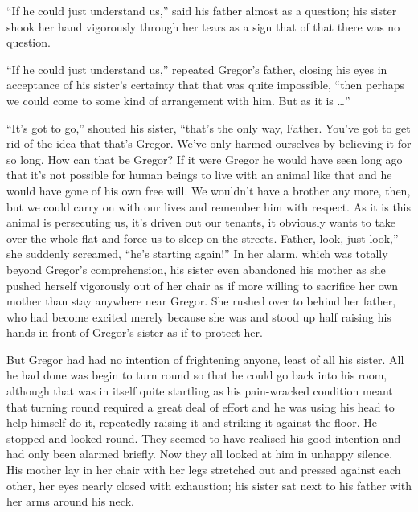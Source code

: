 \documentclass[12pt]{report}
\begin{document}
``If he could just understand us,'' said his father almost as a
question; his sister shook her hand vigorously through her tears as a
sign that of that there was no question.

``If he could just understand us,'' repeated Gregor's father, closing
his eyes in acceptance of his sister's certainty that that was quite
impossible, ``then perhaps we could come to some kind of arrangement
with him. But as it is \ldots{}''

``It's got to go,'' shouted his sister, ``that's the only way, Father.
You've got to get rid of the idea that that's Gregor. We've only harmed
ourselves by believing it for so long. How can that be Gregor? If it
were Gregor he would have seen long ago that it's not possible for human
beings to live with an animal like that and he would have gone of his
own free will. We wouldn't have a brother any more, then, but we could
carry on with our lives and remember him with respect. As it is this
animal is persecuting us, it's driven out our tenants, it obviously
wants to take over the whole flat and force us to sleep on the streets.
Father, look, just look,'' she suddenly screamed, ``he's starting
again!'' In her alarm, which was totally beyond Gregor's comprehension,
his sister even abandoned his mother as she pushed herself vigorously
out of her chair as if more willing to sacrifice her own mother than
stay anywhere near Gregor. She rushed over to behind her father, who had
become excited merely because she was and stood up half raising his
hands in front of Gregor's sister as if to protect her.

But Gregor had had no intention of frightening anyone, least of all his
sister. All he had done was begin to turn round so that he could go back
into his room, although that was in itself quite startling as his
pain-wracked condition meant that turning round required a great deal of
effort and he was using his head to help himself do it, repeatedly
raising it and striking it against the floor. He stopped and looked
round. They seemed to have realised his good intention and had only been
alarmed briefly. Now they all looked at him in unhappy silence. His
mother lay in her chair with her legs stretched out and pressed against
each other, her eyes nearly closed with exhaustion; his sister sat next
to his father with her arms around his neck.
\end{document}

